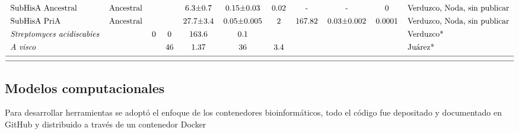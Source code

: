 \documentclass[]{article}
\begin{document}
\begin{landscape}
$${\begin{tabular}{ l c r c c c c c c c l}
SubHisA Ancestral&Ancestral&&&6.3±0.7&0.15±0.03&0.02&-&-&0&Verduzco, Noda, sin publicar\\ [1ex]    
SubHisA PriA&Ancestral&&&27.7±3.4&0.05±0.005&2&167.82&0.03±0.002&0.0001&Verduzco, Noda, sin publicar\\ [1ex]    
\textit{Streptomyces} \textit{acidiscabies}&&0&0&163.6&0.1&&&&&Verduzco*\\ [1ex]  
\textit{A} \textit{visco} &&&46&1.37&36&3.4&&&&Juárez*\\ [1ex]  
\hline \\ [-1.5ex]
\hline
\end{tabular}
}
\label{tab:cineticos}  
$$   
\end{landscape}

\normalsize

\subsection{Modelos computacionales}\label{modelos-computacionales}

Para desarrollar herramientas se adoptó el enfoque de los contenedores
bioinformáticos, todo el código fue depositado y documentado en GitHub y
distribuido a través de un contenedor Docker

\clearpage
\end{document}
